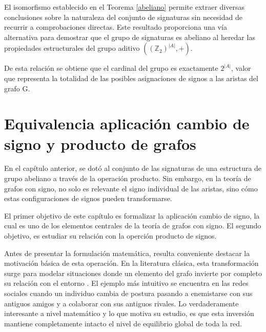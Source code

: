 \documentclass[11pt,a4paper,spanish]{report}
\theoremstyle{plain}
\begin{document}
El isomorfismo establecido en el Teorema \ref{abeliano} permite extraer diversas conclusiones sobre la naturaleza del conjunto de signaturas sin necesidad de recurrir a comprobaciones directas. Este resultado proporciona una vía alternativa para demostrar que el grupo de signaturas es abeliano al heredar las propiedades estructurales del grupo aditivo $((\mathbb{Z}_2)^{|A|}, +)$. 

De esta relación se obtiene que el cardinal del grupo es exactamente $2^{|A|}$, valor que representa la totalidad de las posibles asignaciones de signos a las aristas del grafo G.





\chapter{Equivalencia aplicación cambio de signo y producto de grafos}\label{C4}

En el capítulo anterior, se dotó al conjunto de las signaturas de una estructura de grupo abeliano a través de la operación producto. Sin embargo, en la teoría de grafos con signo, no solo es relevante el signo individual de las aristas, sino cómo estas configuraciones de signos pueden transformarse.

El primer objetivo de este capítulo es formalizar la aplicación cambio de signo, la cual es uno de los elementos centrales de la teoría de grafos con signo. El segundo objetivo, es estudiar su relación con la operción producto de signos.

Antes de presentar la formulación matemática, resulta conveniente destacar la motivación básica de esta operación. En la literatura clásica, esta transformación surge para modelar situaciones donde un elemento del grafo invierte por completo su relación con el entorno \cite{zaslavsky1982signed}. El ejemplo más intuitivo se encuentra en las redes sociales cuando un individuo cambia de postura pasando a enemistarse con sus antiguos amigos y a colaborar con sus antiguos rivales. Lo verdaderamente interesante a nivel matemático y lo que motiva su estudio, es que esta inversión mantiene completamente intacto el nivel de equilibrio global de toda la red.
\end{document}
